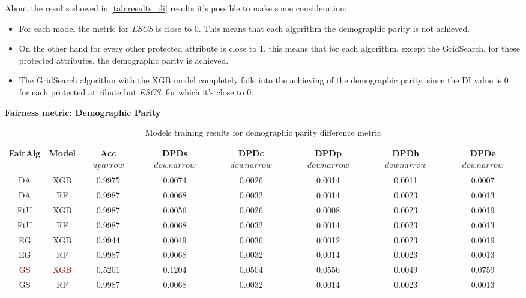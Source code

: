 About the results showed in \cref{tab:results_di} results it's possible to make some consideration:

\begin{itemize}

    \item For each model the metric for \emph{ESCS} is close to 0. This means that each algorithm the demographic parity is not achieved.

    \item On the other hand for every other protected attribute is close to 1, this means that for each algorithm, except the GridSearch, for these protected attributes, the demographic parity is achieved.

    \item The GridSearch algorithm with the XGB model completely fails into the achieving of the demographic parity, since the DI value is 0 for each protected attribute but \emph{ESCS}, for which it's close to 0.
    
\end{itemize}

\textbf{Fairness metric: Demographic Parity}

\begin{table}
    \centering
    \begin{tabular}{|c|c|c|c|c|c|c|c|}
        \hline
        \textbf{FairAlg} & \textbf{Model} & \textbf{Acc} $uparrow$ & \textbf{DPDs} $downarrow$ & \textbf{DPDc} $downarrow$ & \textbf{DPDp} $downarrow$ & \textbf{DPDh} $downarrow$ & \textbf{DPDe} $downarrow$ \\
        \hline
        DA & XGB & 0.9975 & 0.0074 & 0.0026 & 0.0014 & 0.0011 & 0.0007\\
        \hline
        DA & RF & 0.9987 & 0.0068 & 0.0032 & 0.0014 & 0.0023 & 0.0013\\
        \hline
        FtU & XGB & 0.9987 & 0.0056 & 0.0026 & 0.0008 & 0.0023 & 0.0019 \\
        \hline
        FtU & RF & 0.9987 & 0.0068 & 0.0032 & 0.0014 & 0.0023 & 0.0013 \\
        \hline
        EG & XGB & 0.9944 & 0.0049 & 0.0036 & 0.0012 & 0.0023 & 0.0019 \\
        \hline
        EG & RF & 0.9987 & 0.0068 & 0.0032 & 0.0014 & 0.0023 & 0.0013 \\
        \hline
        \textcolor{darkred}{GS} & \textcolor{darkred}{XGB} & 0.5201 & 0.1204 & 0.0504 & 0.0556 & 0.0049 & 0.0759 \\
        \hline
        GS & RF & 0.9987 & 0.0068 & 0.0032 & 0.0014 & 0.0023 & 0.0013 \\
        \hline
    \end{tabular}
    \caption{Models training results for demographic parity difference metric}
    \label{fig:results_dpd}
\end{table}

